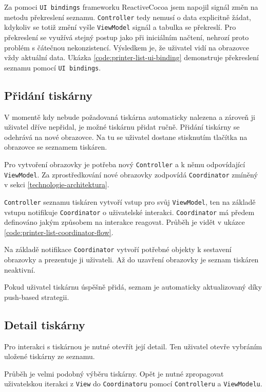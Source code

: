 Za pomoci \texttt{UI bindings} frameworku ReactiveCocoa jsem napojil signál změn na metodu překreslení seznamu.
\texttt{Controller} tedy nemusí o data explicitně žádat, kdykoliv se totiž změní vyšle \texttt{ViewModel} signál a tabulka se překreslí.
Pro překreslení se využívá stejný postup jako při iniciálním načtení, nehrozí proto problém s čátečnou nekonzistencí.
Výsledkem je, že uživatel vidí na obrazovce vždy aktuální data.
Ukázka \ref{code:printer-list-ui-binding} demonstruje překreslení seznamu pomocí \texttt{UI bindings}.


\subsection{Přidání tiskárny}

V momentě kdy nebude požadovaná tiskárna automaticky nalezena a zároveň ji uživatel dříve nepřidal, je možné tiskárnu přidat ručně.
Přidání tiskárny se odehrává na nové obrazovce.
Na tu se uživatel dostane stisknutím tlačítka \uv{+} na obrazovce se seznamem tiskáren.

Pro vytvoření obrazovky je potřeba nový \texttt{Controller} a k němu odpovídající \texttt{ViewModel}.
Za zprostředkování nové obrazovky zodpovídá \texttt{Coordinator} zmíněný v sekci \ref{technologie-architektura}.

\texttt{Controller} seznamu tiskáren vytvoří vstup pro svůj \texttt{ViewModel}, ten na základě vstupu notifikuje \texttt{Coordinator} o uživatelské interakci.
\texttt{Coordinator} má předem definováno jakým způsobem na interakce reagovat.
Průběh je vidět v ukázce \ref{code:printer-list-coordinator-flow}.

Na základě notifikace \texttt{Coordinator} vytvoří potřebné objekty k sestavení obrazovky a prezentuje ji uživateli.
Až do uzavření obrazovky je seznam tiskáren neaktivní.

Pokud uživatel tiskárnu úspěšně přidá, seznam je automaticky aktualizovaný díky push-based strategii.


\subsection{Detail tiskárny}

Pro interakci s tiskárnou je nutné otevřít její detail.
Ten uživatel otevře vybráním uložené tiskárny ze seznamu.

Průběh je velmi podobný výběru tiskárny.
Opět je nutné zpropagovat uživatelskou iterakci z \texttt{View} do \texttt{Coordinatoru} pomocí \texttt{Controlleru} a \texttt{ViewModelu}.